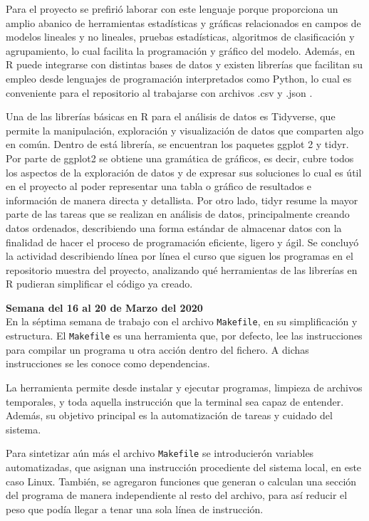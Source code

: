 \documentclass{article}
\begin{document}
    Para el proyecto se prefirió laborar con este lenguaje porque proporciona un amplio abanico de herramientas estadísticas y gráficas relacionados en campos de modelos lineales y no lineales, pruebas estadísticas, algoritmos de clasificación y agrupamiento, lo cual facilita la programación y gráfico del modelo. Además, en R puede integrarse con distintas bases de datos y existen librerías que facilitan su empleo desde lenguajes de programación interpretados como Python, lo cual es conveniente para el repositorio al trabajarse con archivos .csv y .json .

    Una de las librerías básicas en R para el análisis de datos es Tidyverse, que permite la manipulación, exploración y visualización de datos que comparten algo en común. Dentro de está librería, se encuentran los paquetes ggplot 2 y tidyr. Por parte de ggplot2 se obtiene una gramática de gráficos, es decir, cubre todos los aspectos de la exploración de datos y de expresar sus soluciones lo cual es útil en el proyecto al poder representar una tabla o gráfico de resultados e información de manera directa y detallista. Por otro lado, tidyr resume la mayor parte de las tareas que se realizan en análisis de datos, principalmente creando datos ordenados, describiendo una forma estándar de almacenar datos con la finalidad de hacer el proceso de programación eficiente, ligero y ágil.
    Se concluyó la actividad describiendo línea por línea el curso que siguen los programas en el repositorio muestra del proyecto, analizando qué herramientas de las librerías en R pudieran simplificar el código ya creado.

    \textbf{Semana  del 16 al 20 de Marzo del 2020} \\
    En la séptima semana de trabajo con el archivo \texttt{Makefile}, en su simplificación y estructura. El \texttt{Makefile} es una herramienta que, por defecto, lee las instrucciones para compilar un programa u otra acción dentro del fichero. A dichas instrucciones se les conoce como dependencias.
    
    La herramienta permite desde instalar y ejecutar programas, limpieza de archivos temporales, y toda aquella instrucción que la terminal sea capaz de entender. Además, su objetivo principal es la automatización de tareas y cuidado del sistema. 
    
    Para sintetizar aún más el archivo \texttt{Makefile} se introducierón variables automatizadas, que asignan una instrucción procediente del sistema local, en este caso Linux. También, se agregaron funciones que generan o calculan una sección del programa de manera independiente al resto del archivo, para así reducir el peso que podía llegar a tenar una sola línea de instrucción.
    
\end{document}
